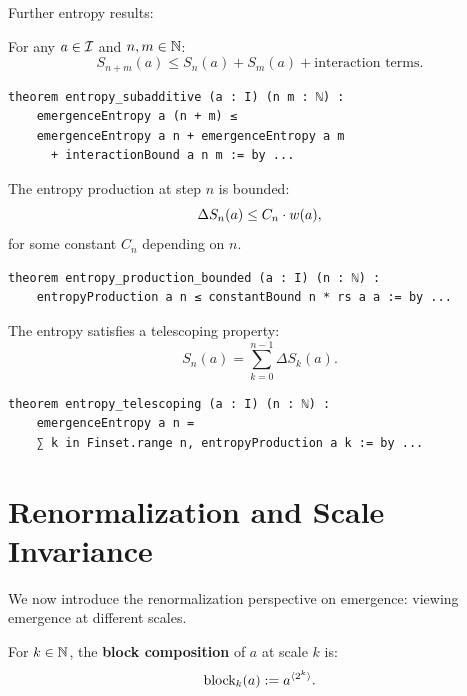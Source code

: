 Further entropy results:

\begin{theorem}
\label{thm:entropy-subadditive}
For any $a \in \mathcal{I}$ and $n, m \in \mathbb{N}$:
\[
  S_{n+m}(a) \leq S_n(a) + S_m(a) + \text{interaction terms}.
\]
\end{theorem}

\begin{lstlisting}[caption={Entropy subadditive (IDT\_v3\_Emergence.lean)}]
theorem entropy_subadditive (a : I) (n m : ℕ) :
    emergenceEntropy a (n + m) ≤
    emergenceEntropy a n + emergenceEntropy a m
      + interactionBound a n m := by ...
\end{lstlisting}

\begin{theorem}
\label{thm:entropy-production-bounded}
The entropy production at step $n$ is bounded:
\[
  \Delta S_n(a) \leq C_n \cdot w(a),
\]
for some constant $C_n$ depending on $n$.
\end{theorem}

\begin{lstlisting}[caption={Entropy production bounded (IDT\_v3\_Emergence.lean)}]
theorem entropy_production_bounded (a : I) (n : ℕ) :
    entropyProduction a n ≤ constantBound n * rs a a := by ...
\end{lstlisting}

\begin{theorem}
\label{thm:entropy-telescoping}
The entropy satisfies a telescoping property:
\[
  S_n(a) = \sum_{k=0}^{n-1} \Delta S_k(a).
\]
\end{theorem}

\begin{lstlisting}[caption={Entropy telescoping (IDT\_v3\_Emergence.lean)}]
theorem entropy_telescoping (a : I) (n : ℕ) :
    emergenceEntropy a n =
    ∑ k in Finset.range n, entropyProduction a k := by ...
\end{lstlisting}


\section{Renormalization and Scale Invariance}

We now introduce the renormalization perspective on emergence: viewing emergence
at different scales.

\begin{definition}
\label{def:block}
For $k \in \mathbb{N}$, the \textbf{block composition} of $a$ at scale $k$ is:
\[
  \text{block}_k(a) := a^{\langle 2^k \rangle}.
\]
\end{definition}


